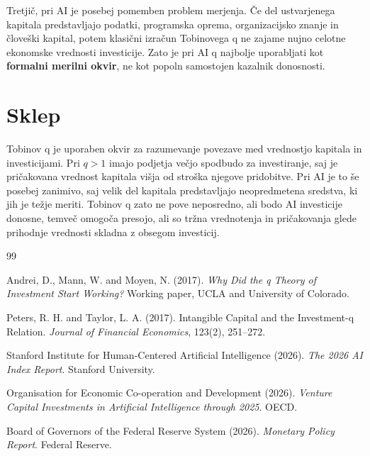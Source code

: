 \documentclass[12pt,a4paper]{article}
\begin{document}
Tretjič, pri AI je posebej pomemben problem merjenja. Če del ustvarjenega kapitala 
predstavljajo podatki, programska oprema, organizacijsko znanje in človeški kapital, 
potem klasični izračun Tobinovega q ne zajame nujno celotne ekonomske vrednosti investicije. 
Zato je pri AI q najbolje uporabljati kot \textbf{formalni merilni okvir}, ne kot popoln 
samostojen kazalnik donosnosti.






\section{Sklep}


Tobinov q je uporaben okvir za razumevanje povezave med vrednostjo kapitala in investicijami. 
Pri \(q>1\) imajo podjetja večjo spodbudo za investiranje, saj je pričakovana vrednost kapitala 
višja od stroška njegove pridobitve. Pri AI je to še posebej zanimivo, saj velik del kapitala 
predstavljajo neopredmetena sredstva, ki jih je težje meriti. Tobinov q zato ne pove neposredno, 
ali bodo AI investicije donosne, temveč omogoča presojo, ali so tržna vrednotenja in 
pričakovanja glede prihodnje vrednosti skladna z obsegom investicij.




\begin{thebibliography}{99}

Andrei, D., Mann, W. and Moyen, N. (2017).
\textit{Why Did the q Theory of Investment Start Working?}
Working paper, UCLA and University of Colorado.

Peters, R. H. and Taylor, L. A. (2017).
Intangible Capital and the Investment-q Relation.
\textit{Journal of Financial Economics}, 123(2), 251--272.

Stanford Institute for Human-Centered Artificial Intelligence (2026).
\textit{The 2026 AI Index Report}.
Stanford University.

Organisation for Economic Co-operation and Development (2026).
\textit{Venture Capital Investments in Artificial Intelligence through 2025}.
OECD.

Board of Governors of the Federal Reserve System (2026).
\textit{Monetary Policy Report}.
Federal Reserve.

\end{thebibliography}
\end{document}
